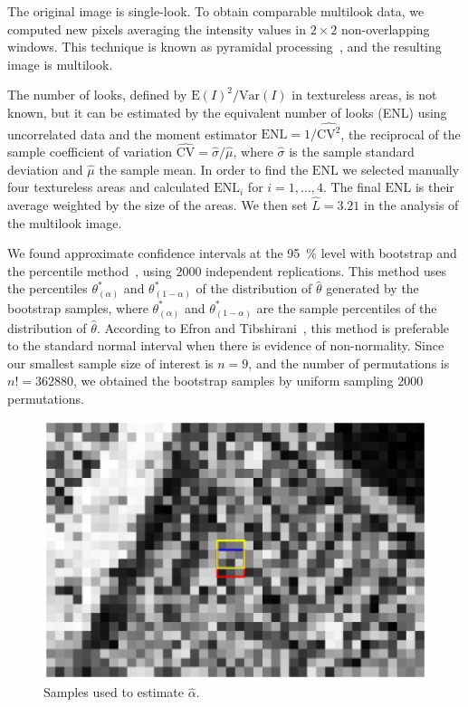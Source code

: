 \documentclass[twocolumn]{svjour3}
\begin{document}
	The original image is single-look.
	To obtain comparable multilook data, we computed new pixels averaging the intensity values in $2\times2$ non-overlapping windows. This technique is known as pyramidal processing~\cite{Adelson1984}, and the resulting image is multilook.
	
	The number of looks, defined by ${\text{E}(I)^2}/{\text{Var}(I)}$ in textureless areas, is not known, but it can be estimated by the equivalent number of looks (ENL) using uncorrelated data and the moment estimator
	$\text{ENL}={1}/{\widehat{\text{CV}^2}}$, the reciprocal of the sample coefficient of variation $\widehat{\text{CV}}={\widehat{\sigma}}/{\widehat\mu}$, where $\widehat{\sigma}$ is the sample standard deviation and $\widehat\mu$ the sample mean.
	In order to find the $\text{ENL}$ we selected manually four textureless areas and calculated $\text{ENL}_i$ for $i=1, \ldots, 4$. 
	The final $\text{ENL}$ is their average weighted by the size of the areas. 
	We then set $\widehat L=3.21$ in the analysis of the multilook image.
	
	We found approximate confidence intervals at the \SI{95}{\percent} level with bootstrap and the percentile method~\cite{Davison1997}, using $2000$ independent replications.
	This method uses the percentiles $\theta^*_{(\alpha)}$ and $\theta^*_{(1-\alpha)}$ of the distribution of $\widehat{\theta} $ generated by the bootstrap samples, where $\theta^*_{(\alpha)}$ and $\theta^*_{(1-\alpha)}$ are the sample percentiles of the distribution of $\widehat{\theta} $. 
	According to Efron and Tibshirani~\cite{Efron93}, this method is preferable to the standard normal interval when there is evidence of non-normality.
	Since our smallest sample size of interest is $n=9$, and the number of permutations is $n!=362880$, we obtained the bootstrap samples by uniform sampling $2000$ permutations.
	
	\begin{figure}[hbt]
		\centering
		\includegraphics[width=0.8\linewidth]{TresMuestrasAgrandada.eps}
		\caption{Samples used to estimate $\widehat{\alpha}$.}\label{TresMuestras} 
	\end{figure}
	
\end{document}
